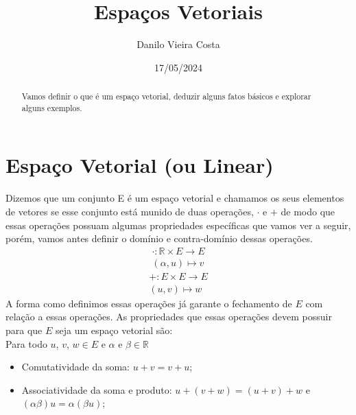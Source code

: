 \documentclass[12pt]{article}
\title{Espaços Vetoriais}
\author{Danilo Vieira Costa}
\date{17/05/2024}
\begin{document}
\maketitle

\begin{abstract}
Vamos definir o que é um espaço vetorial, deduzir alguns fatos básicos e explorar alguns exemplos.
\end{abstract}

\section{Espaço Vetorial (ou Linear)}
Dizemos que um conjunto E é um espaço vetorial e chamamos os seus elementos de vetores se esse conjunto está munido de duas operações, $\cdot$ e $+$ de modo que essas operações possuam algumas propriedades específicas que vamos ver a seguir, porém, vamos antes definir o domínio e contra-domínio dessas operações.
$$
\begin{matrix}
    \cdot : \mathbb{R} \times E\longrightarrow E \\
    \left( \alpha , u\right) \longmapsto v
\end{matrix}
$$
$$
\begin{matrix}
    +: E \times E \longrightarrow E \\\left(u,v\right) \longmapsto w
\end{matrix}  
$$
A forma como definimos essas operações já garante o fechamento de $E$ com relação a essas operações.
As propriedades que essas operações devem possuir para que $E$ seja um espaço vetorial são:\\
Para todo $u$, $v$, $w \in E$ e  $\alpha$ e $\beta \in \mathbb{R}$
\begin{itemize}
    \item Comutatividade da soma: $u+v=v+u$;
    \item Associatividade da soma e produto: $u+\left(v+w\right)=\left(u+v\right)+w$ e $\left(\alpha \beta \right)u=\alpha\left(\beta u\right)$;
\end{itemize}
\end{document}
